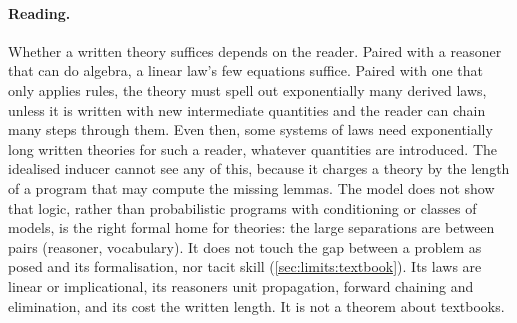 \paragraph{Reading.}\label{rem:shape:reading}
Whether a written theory suffices depends on the reader. Paired with a reasoner that can do algebra, a linear law's few equations suffice. Paired with one that only applies rules, the theory must spell out exponentially many derived laws, unless it is written with new intermediate quantities and the reader can chain many steps through them. Even then, some systems of laws need exponentially long written theories for such a reader, whatever quantities are introduced. The idealised inducer cannot see any of this, because it charges a theory by the length of a program that may compute the missing lemmas. The model does not show that logic, rather than probabilistic programs with conditioning or classes of models, is the right formal home for theories: the large separations are between pairs (reasoner, vocabulary). It does not touch the gap between a problem as posed and its formalisation, nor tacit skill (\cref{sec:limits:textbook}). Its laws are linear or implicational, its reasoners unit propagation, forward chaining and elimination, and its cost the written length. It is not a theorem about textbooks.
